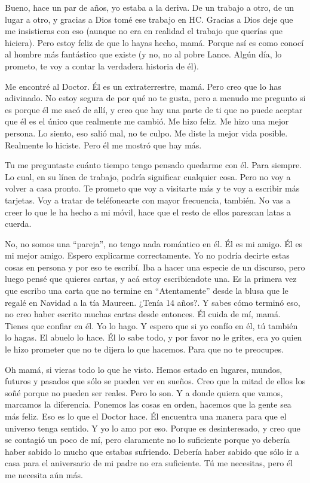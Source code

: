 Bueno, hace un par de años, yo estaba a la deriva. De un trabajo a otro,
de un lugar a otro, y gracias a Dios tomé ese trabajo en HC. Gracias a
Dios deje que me insistieras con eso (aunque no era en realidad el
trabajo que querías que hiciera). Pero estoy feliz de que lo hayas
hecho, mamá. Porque así es como conocí al hombre más fantástico que
existe (y no, no al pobre Lance. Algún día, lo prometo, te voy a contar
la verdadera historia de él).

Me encontré al Doctor. Él es un extraterrestre, mamá. Pero creo que lo
has adivinado. No estoy segura de por qué no te gusta, pero a menudo me
pregunto si es porque él me sacó de allí, y creo que hay una parte de ti
que no puede aceptar que él es el único que realmente me cambió. Me hizo
feliz. Me hizo una mejor persona. Lo siento, eso salió mal, no te culpo.
Me diste la mejor vida posible. Realmente lo hiciste. Pero él me mostró
que hay más.

Tu me preguntaste cuánto tiempo tengo pensado quedarme con él. Para
siempre. Lo cual, en su línea de trabajo, podría significar cualquier
cosa. Pero no voy a volver a casa pronto. Te prometo que voy a visitarte
más y te voy a escribir más tarjetas. Voy a tratar de teléfonearte con
mayor frecuencia, también. No vas a creer lo que le ha hecho a mi móvil,
hace que el resto de ellos parezcan latas a cuerda.

No, no somos una ``pareja'', no tengo nada romántico en él. Él es mi
amigo. Él es mi mejor amigo. Espero explicarme correctamente. Yo no
podría decirte estas cosas en persona y por eso te escribí. Iba a hacer
una especie de un discurso, pero luego pensé que quieres cartas, y acá
estoy escribiendote una. Es la primera vez que escribo una carta que no
termine en ``Atentamente'' desde la blusa que le regalé en Navidad a la
tía Maureen. ¿Tenía 14 años?. Y sabes cómo terminó eso, no creo haber
escrito muchas cartas desde entonces. Él cuida de mí, mamá. Tienes que
confiar en él. Yo lo hago. Y espero que si yo confío en él, tú también
lo hagas. El abuelo lo hace. Él lo sabe todo, y por favor no le grites,
era yo quien le hizo prometer que no te dijera lo que hacemos. Para que
no te preocupes.

Oh mamá, si vieras todo lo que he visto. Hemos estado en lugares,
mundos, futuros y pasados que sólo se pueden ver en sueños. Creo que
la mitad de ellos los soñé porque no pueden ser reales. Pero lo son. Y a
donde quiera que vamos, marcamos la diferencia. Ponemos las cosas en
orden, hacemos que la gente sea más feliz. Eso es lo que el Doctor hace.
Él encuentra una manera para que el universo tenga sentido. Y yo lo amo
por eso. Porque es desinteresado, y creo que se contagió un poco de mí,
pero claramente no lo suficiente porque yo debería haber sabido lo mucho
que estabas sufriendo. Debería haber sabido que sólo ir a casa para el
aniversario de mi padre no era suficiente. Tú me necesitas, pero él me
necesita aún más.

